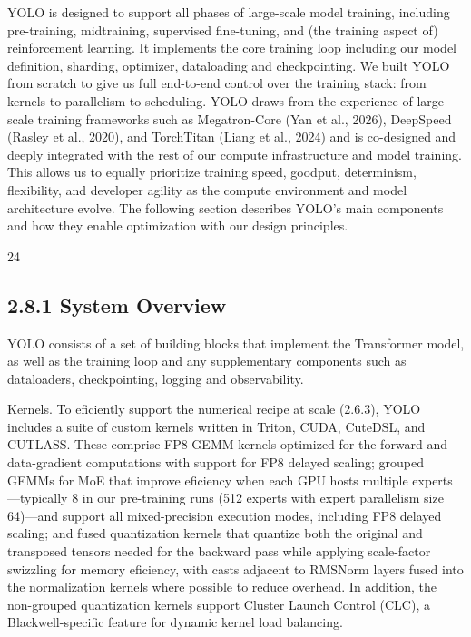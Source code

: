 \documentclass[
  10
]{article}
\begin{document}
YOLO is designed to support all phases of large-scale model training,
including pre-training, midtraining, supervised fine-tuning, and (the
training aspect of) reinforcement learning. It implements the core
training loop including our model definition, sharding, optimizer,
dataloading and checkpointing. We built YOLO from scratch to give us
full end-to-end control over the training stack: from kernels to
parallelism to scheduling. YOLO draws from the experience of large-scale
training frameworks such as Megatron-Core (Yan et al., 2026), DeepSpeed
(Rasley et al., 2020), and TorchTitan (Liang et al., 2024) and is
co-designed and deeply integrated with the rest of our compute
infrastructure and model training. This allows us to equally prioritize
training speed, goodput, determinism, flexibility, and developer agility
as the compute environment and model architecture evolve. The following
section describes YOLO's main components and how they enable
optimization with our design principles.

24

\subsection{2.8.1 System Overview}\label{system-overview}

YOLO consists of a set of building blocks that implement the Transformer
model, as well as the training loop and any supplementary components
such as dataloaders, checkpointing, logging and observability.

Kernels. To eficiently support the numerical recipe at scale (2.6.3),
YOLO includes a suite of custom kernels written in Triton, CUDA,
CuteDSL, and CUTLASS. These comprise FP8 GEMM kernels optimized for the
forward and data-gradient computations with support for FP8 delayed
scaling; grouped GEMMs for MoE that improve eficiency when each GPU
hosts multiple experts---typically 8 in our pre-training runs (512
experts with expert parallelism size 64)---and support all
mixed-precision execution modes, including FP8 delayed scaling; and
fused quantization kernels that quantize both the original and
transposed tensors needed for the backward pass while applying
scale-factor swizzling for memory eficiency, with casts adjacent to
RMSNorm layers fused into the normalization kernels where possible to
reduce overhead. In addition, the non-grouped quantization kernels
support Cluster Launch Control (CLC), a Blackwell-specific feature for
dynamic kernel load balancing.
\end{document}
